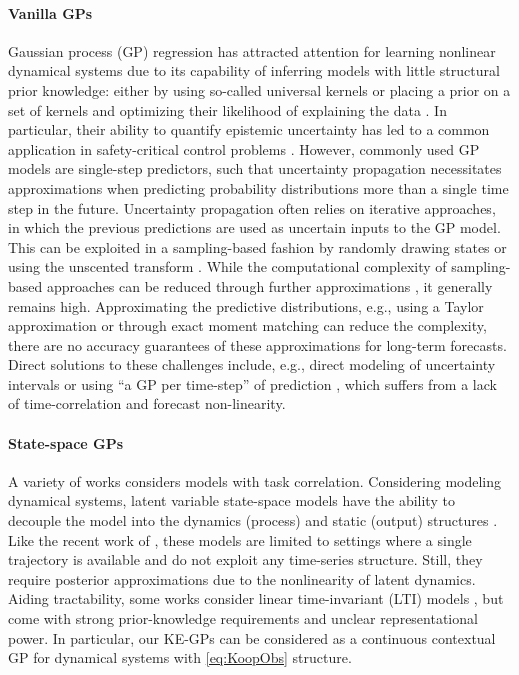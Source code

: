 \paragraph{Vanilla GPs}
Gaussian process (GP) regression \citep{Rasmussen2006} has attracted attention for learning nonlinear dynamical systems due to its capability of inferring models with little structural prior knowledge: either by using so-called universal kernels \citep{Micchelli2006UniversalKernels} or placing a prior on a set of kernels and optimizing their likelihood of explaining the data \citep{Duvenaud2014}. 
In particular, their ability to quantify epistemic uncertainty has led to a common application in safety-critical control problems \citep{BerkenkampECC15,pmlr-v37-sui15,NIPS2017_766ebcd5,CuriCDC22}. However, commonly used GP models are single-step predictors, such that uncertainty propagation necessitates approximations when predicting probability distributions more than a single time step in the future. Uncertainty propagation often relies on iterative approaches, in which the previous predictions are used as uncertain inputs to the GP model. This can be exploited in a sampling-based fashion by randomly drawing states \citep{Bradford2019} or using the unscented transform \citep{Ko2007a}.
While the computational complexity of sampling-based approaches can be reduced through further approximations \citep{pmlr-v120-hewing20a, TBpredGP}, it generally remains high.
Approximating the predictive distributions, e.g., using a Taylor approximation \citep{Girard2003} or through exact moment matching \citep{Deisenroth2011PILCO:Search} can reduce the complexity, there are no accuracy guarantees of these approximations for long-term forecasts. 
Direct solutions to these challenges include, e.g., direct modeling of uncertainty intervals \citep{Polymenakos2020, Curi2020} or using ``a GP per time-step'' of prediction \citep{Pfefferkorn2022}, which suffers from a lack of time-correlation and forecast non-linearity.


\paragraph{State-space GPs}
A variety of works considers models with task correlation. Considering modeling dynamical systems, latent variable state-space models have the ability to decouple the model into the dynamics (process) and static (output) structures \citep{Wang2005_ccd45007,pmlr-v9-titsias10a, Frigola2014, Damianou2016, NIPS2017_1006ff12}. Like the recent work of \citep{Fan2023}, these models are limited to settings where a single trajectory is available and do not exploit any time-series structure. Still, they require posterior approximations due to the nonlinearity of latent dynamics. 
Aiding tractability, some works consider linear time-invariant (LTI) models \citep{pmlr-v5-alvarez09a,Sarkka2013}, but come with strong prior-knowledge requirements and unclear representational power. In particular, our KE-GPs can be considered as a continuous
contextual GP for dynamical systems with \eqref{eq:KoopObs} structure.

